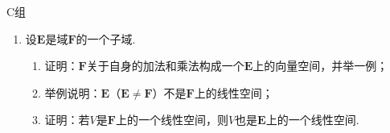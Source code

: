 \centerline{\heiti C组}
\begin{enumerate}
    \item 设$\mathbf{E}$是域$\mathbf{F}$的一个子域.
    \begin{enumerate}[label=(\arabic*)]
        \item 证明：$\mathbf{F}$关于自身的加法和乘法构成一个$\mathbf{E}$上的向量空间，并举一例；

        \item 举例说明：$\mathbf{E}$（$\mathbf{E}\neq \mathbf{F}$）不是$\mathbf{F}$上的线性空间；

        \item 证明：若$V$是$\mathbf{F}$上的一个线性空间，则$V$也是$\mathbf{E}$上的一个线性空间.
    \end{enumerate}
\end{enumerate}
